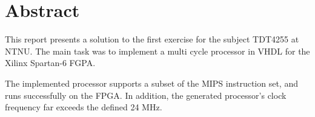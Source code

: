 \section*{Abstract}
\label{sec:abstract}

\vspace*{\fill}
This report presents a solution to the first exercise for the subject TDT4255 at NTNU.
The main task was to implement a multi cycle processor in VHDL for the Xilinx Spartan-6 FGPA.

The implemented processor supports a subset of the MIPS instruction set, and runs successfully on the FPGA.
In addition, the generated processor's clock frequency far exceeds the defined 24 MHz.
\vspace*{\fill}
